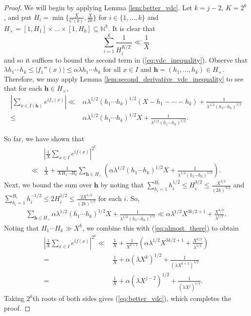 \documentclass[12pt]{article}
\theoremstyle{plain} %
\theoremstyle{definition} %
\theoremstyle{plain}
\theoremstyle{plain}
\numberwithin{equation}{section}
\newcommand{\N}{\mathbb{N}}
\renewcommand{\leq}{\leqslant}
\renewcommand{\subset}{\subseteq}
\newcommand{\1}{\mathbbm{1}}
\begin{document}
\begin{proof}
    We will begin by applying Lemma \ref{lem:better_vdc}. Let $k=j-2$, $K=2^k$, and put $H_i = \min\{\frac{X}{C(k)},\frac{X}{2k}\}$ for $i\in \{1,\dots, k\}$ and $H_{\times} = [1,H_1]\times \dots \times [1,H_k]\subset \N^k$. It is clear that 
    \[
    \sum_{i=1}^k\frac{1}{H_i^{K/2^i}}\ll \frac{1}{X}
    \]
    and so it suffices to bound the second term in (\ref{eq:vdc_inequality}). Observe that $\lambda h_1\cdots h_k \leq |f_1{''}(x)|\leq \alpha\lambda h_1\cdots h_k$ for all $x\in I$ and $\mathbf{h}=(h_1,\dots, h_k)\in H_{\times}$. Therefore, we may apply Lemma \ref{lem:second_derivative_vdc_inequality} to see that for each $\mathbf{h} \in H_{\times}$, 
    \begin{align*}
        \left|\sum_{x\in I(\mathbf{h})}e^{if_1(x)}\right| \ll& \alpha \lambda^{1/2}(h_1\cdots h_k)^{1/2}(X-h_1-\cdots -h_k)+\frac{1}{\lambda^{1/2}(h_1\cdots h_k)^{1/2}}\\
        \leq & \alpha \lambda^{1/2}(h_1\cdots h_k)^{1/2}X+\frac{1}{\lambda^{1/2}(h_1\cdots h_k)^{1/2}}.
    \end{align*}

    So far, we have shown that 
    \begin{align}
         &\left|\frac{1}{X}\sum_{x\in I}e^{if(x)}\right|^{2^k}\\
         \ll&  \frac{1}{X} + \frac{1}{XH_1\cdots H_k}\sum_{\mathbf{h}\in H_{\times}}\left( \alpha \lambda^{1/2}(h_1\cdots h_k)^{1/2}X+\frac{1}{\lambda^{1/2}(h_1\cdots h_k)^{1/2}}\right)\label{eq:almost_there}.
    \end{align}
    Next, we bound the sum over $\mathbf{h}$ by noting that $\sum_{h_i=1}^{H_i}h_i^{1/2} \leq H_i^{3/2}\leq \frac{X^{3/2}}{(2k)^{3/2}}$ and $\sum_{h_i=1}^{H_i}h_i^{-1/2} \leq 2H_i^{1/2}\leq \frac{2X^{1/2}}{(2k)^{1/2}}$ for each $i$. So,
    \begin{align*}
        \sum_{\mathbf{h}\in H_{\times}} \alpha \lambda^{1/2}(h_1\cdots h_k)^{1/2}X+\frac{1}{\lambda^{1/2}(h_1\cdots h_k)^{1/2}} \ll \alpha\lambda^{1/2}X^{3k/2+1} +\frac{X^{k/2}}{\lambda^{1/2}}.
    \end{align*}
    Noting that $H_1\cdots H_k\gg X^k$, we combine this with (\ref{eq:almost_there}) to obtain
    \begin{align*}
        \left|\frac{1}{X}\sum_{x\in I}e^{if(x)}\right|^{2^k}
         \ll&  \frac{1}{X} +  \frac{1}{X^{k+1}}\left(\alpha\lambda^{1/2}X^{3k/2+1}+\frac{X^{k/2}}{\lambda^{1/2}}\right)\\
         =&\frac{1}{X} +\alpha(\lambda X^{k})^{1/2}+\frac{1}{(\lambda X^{k+2})^{1/2}}
         \\=&\frac{1}{X} +\alpha(\lambda X^{j-2})^{1/2}+\frac{1}{(\lambda X^{j})^{1/2}}.
    \end{align*}
    Taking $2^k$th roots of both sides gives (\ref{eq:better_vdc}), which completes the proof.
\end{proof}
\end{document}
